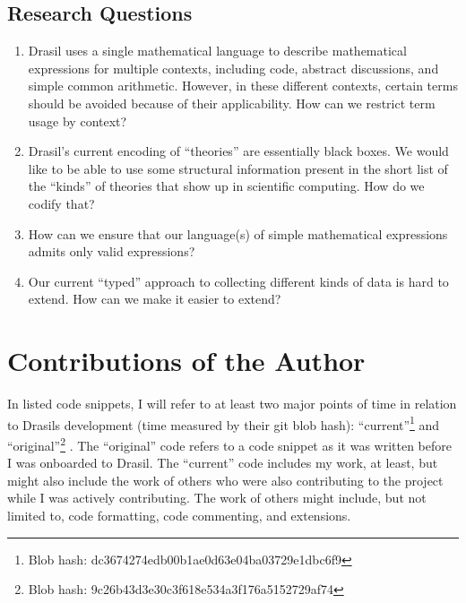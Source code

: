 \subsection{Research Questions}
\label{sec:intro:researchquestions}

\begin{enumerate}

      \item[\namedlabel{rq:lang_division}{RQ1}] Drasil uses a single
            mathematical language to describe mathematical expressions for
            multiple contexts, including code, abstract discussions, and simple
            common arithmetic. However, in these different contexts, certain
            terms should be avoided because of their applicability. How can we
            restrict term usage by context?

      \item[\namedlabel{rq:modelkinds}{RQ2}] Drasil's current encoding of
            ``theories'' are essentially black boxes. We would like to be able
            to use some structural information present in the short list of the
            ``kinds'' of theories that show up in scientific computing. How do
            we codify that?

      \item[\namedlabel{rq:typing}{RQ3}] How can we ensure that our language(s)
            of simple mathematical expressions admits only valid expressions?

      \item[\namedlabel{rq:chunkdb}{RQ4}] Our current ``typed'' approach to
            collecting different kinds of data is hard to extend. How can we
            make it easier to extend?

\end{enumerate}

\section{Contributions of the Author}
\label{sec:intro:contributions}

In listed code snippets, I will refer to at least two major points of time in
relation to Drasils development (time measured by their git blob hash):
``current''\footnote{Blob hash: dc3674274edb00b1ae0d63e04ba03729e1dbc6f9} and
``original''\footnote{Blob hash: 9c26b43d3e30c3f618e534a3f176a5152729af74}
. The ``original'' code refers
to a code snippet as it was written before I was onboarded to Drasil. The
``current'' code includes my work, at least, but might also include the work of
others who were also contributing to the project while I was actively
contributing. The work of others might include, but not limited to, code
formatting, code commenting, and extensions.

